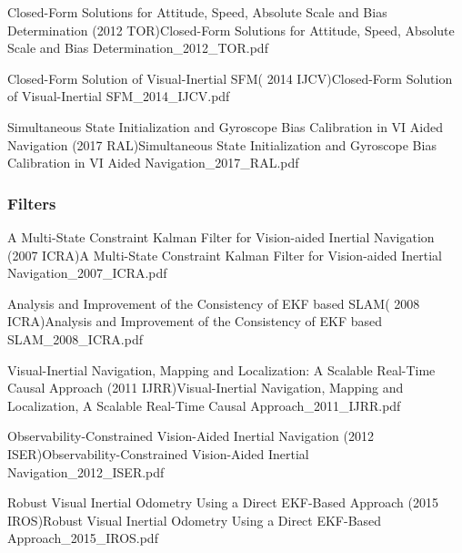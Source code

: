 \documentclass[10pt,a4paper]{scrartcl}
\begin{document}
\begin{multicols*}{2}
\begin{Paper}{Closed-Form Solutions for Attitude, Speed, Absolute Scale and Bias Determination (2012 TOR)}{Closed-Form Solutions for Attitude, Speed, Absolute Scale and Bias Determination_2012_TOR.pdf}
\end{Paper}

\begin{Paper}{Closed-Form Solution of Visual-Inertial SFM( 2014 IJCV)}{Closed-Form Solution of Visual-Inertial SFM_2014_IJCV.pdf}
\end{Paper}

\begin{Paper}{Simultaneous State Initialization and Gyroscope Bias Calibration in VI Aided Navigation (2017 RAL)}{Simultaneous State Initialization and Gyroscope Bias Calibration in VI Aided Navigation_2017_RAL.pdf}
\end{Paper}

\subsubsection{Filters}

\begin{Paper}{A Multi-State Constraint Kalman Filter for Vision-aided Inertial Navigation (2007 ICRA)}{A Multi-State Constraint Kalman Filter for Vision-aided Inertial Navigation_2007_ICRA.pdf}
\end{Paper}

\begin{Paper}{Analysis and Improvement of the Consistency of EKF based SLAM( 2008 ICRA)}{Analysis and Improvement of the Consistency of EKF based SLAM_2008_ICRA.pdf}
\end{Paper}

\begin{Paper}{Visual-Inertial Navigation, Mapping and Localization: A Scalable Real-Time Causal Approach (2011 IJRR)}{Visual-Inertial Navigation, Mapping and Localization, A Scalable Real-Time Causal Approach_2011_IJRR.pdf}
\end{Paper}

\begin{Paper}{Observability-Constrained Vision-Aided Inertial Navigation (2012 ISER)}{Observability-Constrained Vision-Aided Inertial Navigation_2012_ISER.pdf}
\end{Paper}

\begin{Paper}{Robust Visual Inertial Odometry Using a Direct EKF-Based Approach (2015 IROS)}{Robust Visual Inertial Odometry Using a Direct EKF-Based Approach_2015_IROS.pdf}
\end{Paper}


\end{multicols*}
\end{document}
